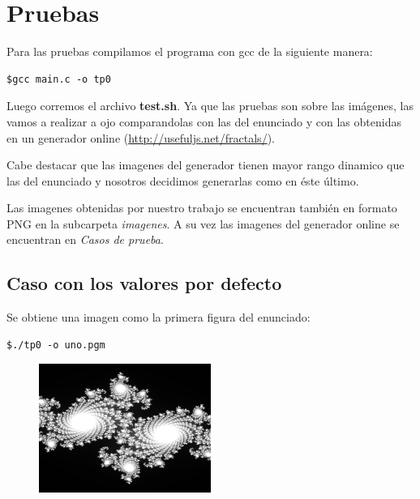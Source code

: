 \documentclass[a4paper,10pt]{article}
\begin{document}


\newpage

\section{Pruebas}

Para las pruebas compilamos el programa con gcc de la siguiente manera:

\begin{lstlisting}[frame=single]
$gcc main.c -o tp0
\end{lstlisting}
Luego corremos el archivo \textbf{test.sh}.
Ya que las pruebas son sobre las imágenes, las vamos a realizar a ojo comparandolas con las del enunciado y con las obtenidas en un generador online (\url{http://usefuljs.net/fractals/}).

Cabe destacar que las imagenes del generador tienen mayor rango dinamico que las del enunciado y nosotros decidimos generarlas como en \'{e}ste \'{u}ltimo.

Las imagenes obtenidas por nuestro trabajo se encuentran tambi\'{e}n en formato PNG en la subcarpeta \textit{imagenes}.
A su vez las imagenes del generador online se encuentran en \textit{Casos de prueba}.

\subsection{Caso con los valores por defecto}
Se obtiene una imagen como la primera figura del enunciado:

\begin{lstlisting}[frame=single]
$./tp0 -o uno.pgm
\end{lstlisting}

\begin{figure}[H]
\begin{center}
\includegraphics[width=0.5\textwidth]{imagenes/uno.png}
\caption{} \label{uno}
\end{center}
\end{figure}
\end{document}
